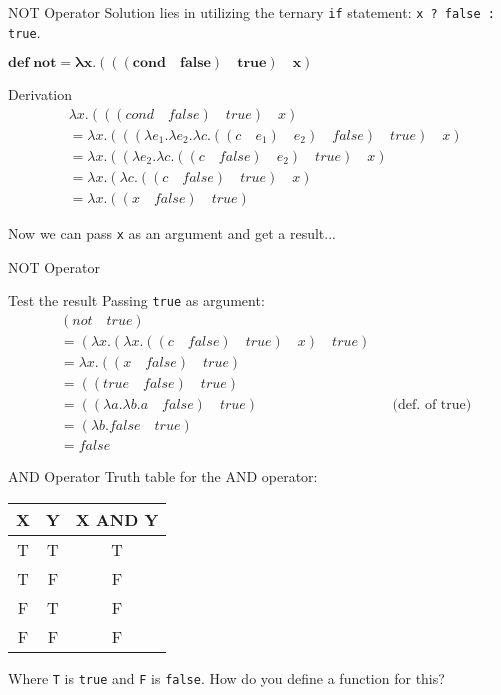 \documentclass{beamer}
\begin{document}
\begin{frame}{NOT Operator}
Solution lies in utilizing the ternary \texttt{if} statement: \texttt{x ? false : true}.
\begin{framed} $\mathbf{def \; not = \lambda x . (((cond \quad false) \quad true) \quad x)}$ \end{framed}
\begin{block}{Derivation}
\begin{align*}
	&\lambda x . (((cond \quad false) \quad true) \quad x) \\
    &= \lambda x.(((\lambda e_1. \lambda e_2 . \lambda c . ((c \quad e_1) \quad e_2) \quad false) \quad true) \quad x) \\
    &= \lambda x.((\lambda e_2 . \lambda c . ((c \quad false) \quad e_2) \quad true) \quad x) \\
    &= \lambda x.(\lambda c . ((c \quad false) \quad true) \quad x) \\
    &= \lambda x.((x \quad false) \quad true)
\end{align*}
\end{block}
Now we can pass \texttt{x} as an argument and get a result...
\end{frame}

\begin{frame}{NOT Operator}
\begin{block}{Test the result}
Passing \texttt{true} as argument:
\begin{align*}
	&(not \quad true) \\
    &= (\lambda x.(\lambda x. ((c \quad false) \quad true) \quad x) \quad true) &&\\
    &= \lambda x.((x \quad false) \quad true) &&\\
    &= ((true \quad false) \quad true) &&\\
    &= ((\lambda a . \lambda b . a \quad false) \quad true) &&\text{(def. of true)}\\
    &= (\lambda b . false \quad true) &&\\
    &= false &&
\end{align*}
\end{block}
\end{frame}

\begin{frame}{AND Operator}
Truth table for the AND operator:
\begin{table}
\centering
\begin{tabular}{c|c|c}
X & Y & X AND Y \\\hline
T & T & T \\
T & F & F \\
F & T & F \\
F & F & F
\end{tabular}
\end{table}
Where \texttt{T} is \texttt{true} and \texttt{F} is \texttt{false}. How do you define a function for this?
\end{frame}
\end{document}
